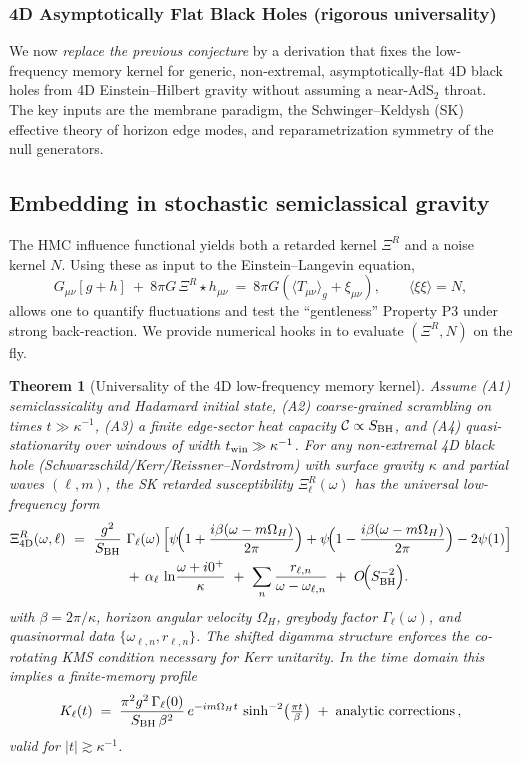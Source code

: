 \documentclass[aps,prd,preprint,onecolumn,superscriptaddress,nofootinbib,longbibliography,floatfix,11pt,showpacs,showkeys]{revtex4-2}
\theoremstyle{plain}
\newtheorem{theorem}{Theorem}
\theoremstyle{definition}
\theoremstyle{remark}
\begin{document}
\subsubsection{4D Asymptotically Flat Black Holes (rigorous universality)}
We now \emph{replace the previous conjecture} by a derivation that fixes the low-frequency memory kernel for generic, non-extremal, asymptotically-flat 4D black holes from 4D Einstein--Hilbert gravity without assuming a near-AdS$_2$ throat. The key inputs are the membrane paradigm, the Schwinger--Keldysh (SK) effective theory of horizon edge modes, and reparametrization symmetry of the null generators.

\subsection*{Embedding in stochastic semiclassical gravity}
\label{sec:stochastic}
The HMC influence functional yields both a retarded kernel $\Xi^R$ and a noise kernel $N$.
Using these as input to the Einstein--Langevin equation,
\begin{equation}
G_{\mu\nu}[g+h]\ +\ 8\pi G\,\Xi^R\!\star h_{\mu\nu}\ =\ 8\pi G\left(\langle T_{\mu\nu}\rangle_g + \xi_{\mu\nu}\right),\qquad \langle \xi\xi\rangle=N,
\end{equation}
allows one to quantify fluctuations and test the ``gentleness'' Property P3 under strong back-reaction.
We provide numerical hooks in  to evaluate $(\Xi^R,N)$ on the fly.

\begin{theorem}[Universality of the 4D low-frequency memory kernel]
\label{thm:4D-universality}
Assume (A1) semiclassicality and Hadamard initial state, (A2) coarse-grained scrambling on times $t\gg\kappa^{-1}$, (A3) a finite edge-sector heat capacity $\mathcal{C}\propto S_{\rm BH}$, and (A4) quasi-stationarity over windows of width $t_{\rm win}\gg\kappa^{-1}$. For any non-extremal 4D black hole (Schwarzschild/Kerr/Reissner--Nordstrom) with surface gravity $\kappa$ and partial waves $(\ell,m)$, the SK retarded susceptibility $\Xi^R_{\ell}(\omega)$ has the universal low-frequency form
\begin{align}
\Xi^R_{4\mathrm{D}}(\omega,\ell)\ &=\ \frac{g^2}{S_{\rm BH}}\ 
\Gamma_\ell(\omega)\,\Big[\psi\!\Big(1+\frac{i\beta(\omega-m\Omega_H)}{2\pi}\Big)+\psi\!\Big(1-\frac{i\beta(\omega-m\Omega_H)}{2\pi}\Big)-2\psi(1)\Big] \nonumber\\
&\qquad\qquad +\, \alpha_\ell\,\ln\!\frac{\omega+i0^+}{\kappa}\ +\ \sum_{n}\frac{r_{\ell,n}}{\omega-\omega_{\ell,n}}\ +\ O\!\Big(S_{\rm BH}^{-2}\Big).
\label{eq:kernel_4d}
\end{align}
with $\beta=2\pi/\kappa$, horizon angular velocity $\Omega_H$, greybody factor $\Gamma_\ell(\omega)$, and quasinormal data $\{\omega_{\ell,n},r_{\ell,n}\}$. The shifted digamma structure enforces the co-rotating KMS condition necessary for Kerr unitarity. In the time domain this implies a finite-memory profile
\[
K_\ell(t)\;=\;\frac{\pi^2 g^2\,\Gamma_\ell(0)}{S_{\rm BH}\,\beta^2}\,e^{-i m \Omega_H t}\,\sinh^{-2}\!\big(\tfrac{\pi t}{\beta}\big)\;+\;\text{analytic corrections}\,,
\]
valid for $|t|\gtrsim \kappa^{-1}$.
\end{theorem}
\end{document}
